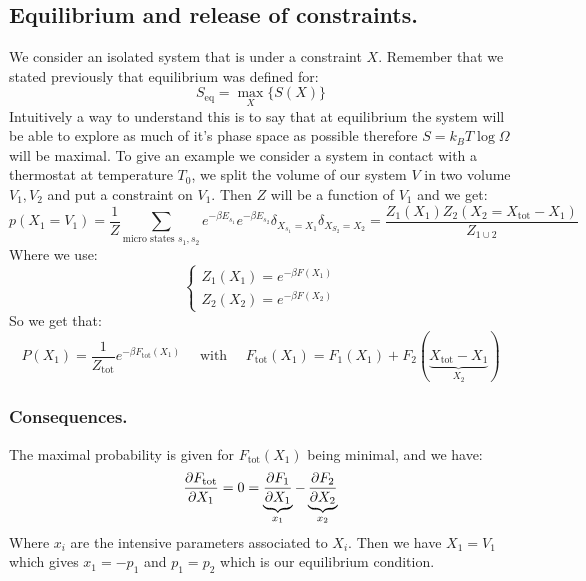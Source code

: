 \documentclass[10pt,a4paper]{book}
\begin{document}
\subsection{Equilibrium and release of constraints.}
We consider an isolated system that is under a constraint $X$. Remember that we stated previously that equilibrium was defined for:
\[
S_\text{eq} = \max_X \{S(X)\}
\]
Intuitively a way to understand this is to say that at equilibrium the system will be able to explore as much of it's phase space as possible therefore $S = k_B T \log \Omega$ will be maximal. To give an example we consider a system in contact with a thermostat at temperature $T_0$, we split the volume of our system $V$ in two volume $V_1,V_2$ and put a constraint on $V_1$. Then $Z$ will be a function of $V_1$ and we get:
\[
p(X_1 = V_1) = \frac{1}{Z} \sum_{\text{micro states } s_1, s_2} e^{-\beta E_{s_1}} e^{- \beta E_{s_2}} \delta_{X_{s_1} = X_1} \delta_{X_{S_2} = X_2} = \frac{Z_1(X_1)Z_2(X_2 = X_\text{tot} - X_1)}{Z_{1 \cup 2}}
\]
Where we use:
\[
\begin{cases}
Z_1(X_1) = e^{-\beta F(X_1)}\\
Z_2(X_2) = e^{-\beta F(X_2)}
\end{cases}
\]
So we get that:
\[
P(X_1) = \frac{1}{Z_\text{tot}} e^{-\beta F_\text{tot}(X_1)} \quad \text{ with } \quad F_\text{tot}(X_1) = F_1(X_1) + F_2(\underbrace{X_\text{tot} - X_1}_{X_2})
\]
\subsubsection{Consequences.}
The maximal probability is given for $F_\text{tot}(X_1)$ being minimal, and we have:
\[
\pdv{F_\text{tot}}{X_1} = 0 = \underbrace{\pdv{F_1}{X_1}}_{x_1} - \underbrace{\pdv{F_2}{X_2}}_{x_2}
\]
Where $x_i$ are the intensive parameters associated to $X_i$. Then we have $X_1 =V_1$ which gives $x_1 = -p_1$ and $p_1 = p_2$ which is our equilibrium condition.
\end{document}
